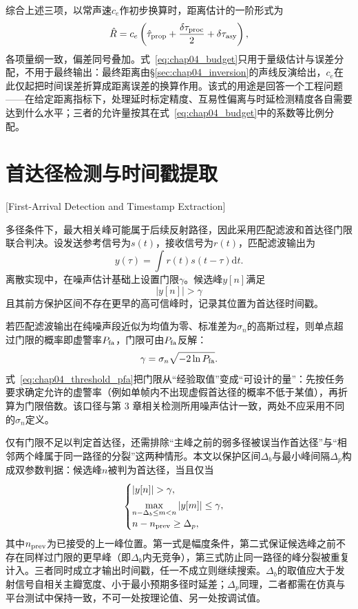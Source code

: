 综合上述三项，以常声速$c_e$作初步换算时，距离估计的一阶形式为
\begin{equation}
 \hat R=c_e\left(\hat\tau_{\rm prop}+\frac{\delta\tau_{\rm proc}}{2}+\delta\tau_{\rm asy}\right),
\label{eq:chap04_budget}
\end{equation}
各项量纲一致，偏差同号叠加。式~\eqref{eq:chap04_budget}只用于量级估计与误差分配，不用于最终输出：最终距离由\S\ref{sec:chap04_inversion}的声线反演给出，$c_e$在此仅起把时间误差折算成距离误差的换算作用。该式的用途是回答一个工程问题——在给定距离指标下，处理延时标定精度、互易性偏离与时延检测精度各自需要达到什么水平；三者的允许量按其在式~\eqref{eq:chap04_budget}中的系数等比例分配。

\section{首达径检测与时间戳提取}[First-Arrival Detection and Timestamp Extraction]
\label{sec:chap04_first_arrival}

多径条件下，最大相关峰可能属于后续反射路径，因此采用匹配滤波和首达径门限联合判决。设发送参考信号为$s(t)$，接收信号为$r(t)$，匹配滤波输出为
\begin{equation}
 y(\tau)=\int r(t)s(t-\tau)\mathrm{d}t .
\label{eq:chap04_match}
\end{equation}
离散实现中，在噪声估计基础上设置门限$\gamma$。候选峰$y[n]$满足
\begin{equation}
 |y[n]|>\gamma
\label{eq:chap04_threshold}
\end{equation}
且其前方保护区间不存在更早的高可信峰时，记录其位置为首达径时间戳。

若匹配滤波输出在纯噪声段近似为均值为零、标准差为$\sigma_n$的高斯过程，则单点超过门限的概率即虚警率$P_{\rm fa}$，门限可由$P_{\rm fa}$反解：
\begin{equation}
 \gamma=\sigma_n\sqrt{-2\ln P_{\rm fa}} .
\label{eq:chap04_threshold_pfa}
\end{equation}
式~\eqref{eq:chap04_threshold_pfa}把门限从“经验取值”变成“可设计的量”：先按任务要求确定允许的虚警率（例如单帧内不出现虚假首达径的概率不低于某值），再折算为门限倍数。该口径与第 3 章相关检测所用噪声估计一致，两处不应采用不同的$\sigma_n$定义。

仅有门限不足以判定首达径，还需排除“主峰之前的弱多径被误当作首达径”与“相邻两个峰属于同一路径的分裂”这两种情形。本文以保护区间$\Delta_b$与最小峰间隔$\Delta_p$构成双参数判据：候选峰$n$被判为首达径，当且仅当
\begin{equation}
 \begin{cases}
  |y[n]|>\gamma,\\[2pt]
  \displaystyle\max_{n-\Delta_b\le m<n}|y[m]|\le\gamma,\\[4pt]
  n-n_{\rm prev}\ge\Delta_p,
 \end{cases}
\label{eq:chap04_first_arrival}
\end{equation}
其中$n_{\rm prev}$为已接受的上一峰位置。第一式是幅度条件，第二式保证候选峰之前不存在同样过门限的更早峰（即$\Delta_b$内无竞争），第三式防止同一路径的峰分裂被重复计入。三者同时成立才输出时间戳，任一不成立则继续搜索。$\Delta_b$的取值应大于发射信号自相关主瓣宽度、小于最小预期多径时延差；$\Delta_p$同理，二者都需在仿真与平台测试中保持一致，不可一处按理论值、另一处按调试值。

